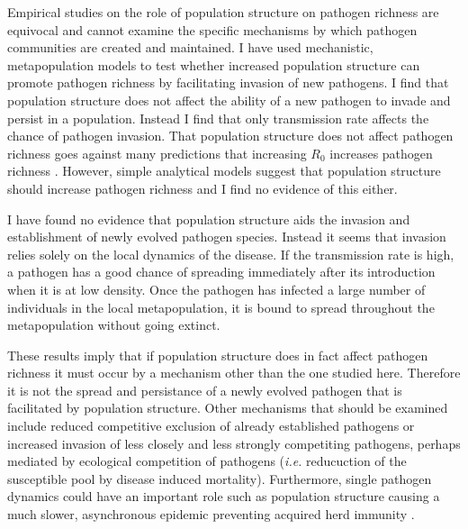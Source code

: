 
Empirical studies on the role of population structure on pathogen richness are equivocal and cannot examine the specific mechanisms by which pathogen communities are created and maintained.
I have used mechanistic, metapopulation models to test whether increased population structure can promote pathogen richness by facilitating invasion of new pathogens.
I find that population structure does not affect the ability of a new pathogen to invade and persist in a population.
Instead I find that only transmission rate affects the chance of pathogen invasion.
That population structure does not affect pathogen richness goes against many predictions that increasing $R_0$ increases pathogen richness \cite{nunn2003comparative, morand2000wormy, poulin2014parasite, poulin2000diversity, altizer2003social}.
However, simple analytical models suggest that population structure should increase pathogen richness \cite{qiu2013vector, allen2004sis, nunes2006localized} and I find no evidence of this either.

I have found no evidence that population structure aids the invasion and establishment of newly evolved pathogen species.
Instead it seems that invasion relies solely on the local dynamics of the disease.
If the transmission rate is high, a pathogen has a good chance of spreading immediately after its introduction when it is at low density.
Once the pathogen has infected a large number of individuals in the local metapopulation, it is bound to spread throughout the metapopulation without going extinct.


These results imply that if population structure does in fact affect pathogen richness \cite{maganga2014bat, turmelle2009correlates, gay2014parasite} it must occur by a mechanism other than the one studied here.
Therefore it is not the spread and persistance of a newly evolved pathogen that is facilitated by population structure.
Other mechanisms that should be examined include reduced competitive exclusion of already established pathogens or increased invasion of less closely and less strongly competiting pathogens, perhaps mediated by ecological competition of pathogens (\emph{i.e.} reducuction of the susceptible pool by disease induced mortality).
Furthermore, single pathogen dynamics could have an important role such as population structure causing a much slower, asynchronous epidemic preventing acquired herd immunity \cite{plowright2011urban}.

